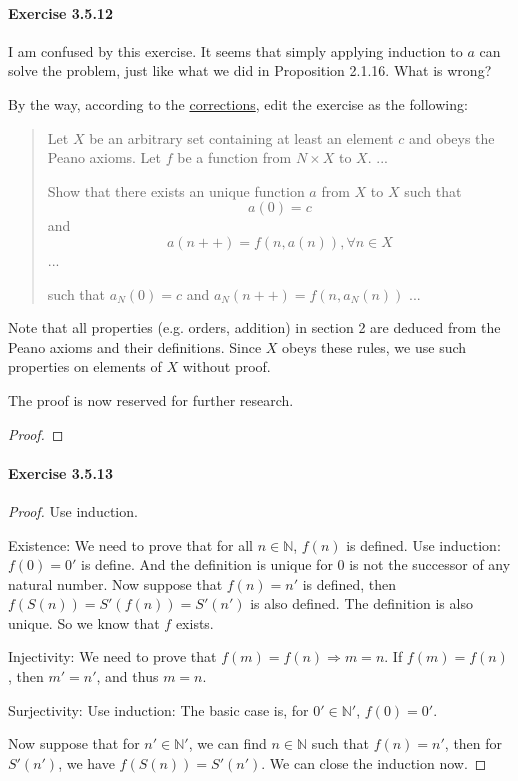 \paragraph{Exercise 3.5.12} \label{exercise3.5.12}
I am confused by this exercise. It seems that simply applying induction to $a$ can solve the 
problem, just like what we did in Proposition 2.1.16. What is wrong?

By the way, according to the \href{https://terrytao.wordpress.com/books/analysis-i/}{corrections}, 
edit the exercise as the following:
\begin{quotation}
Let $X$ be an arbitrary set containing at least an element $c$ and obeys the Peano axioms. Let $f$ be a 
function from $N \times X$ to $X$. ... 

Show that there exists an unique function $a$ from $X$ to $X$ such that 
\[
a(0) = c
\] 
and 
\[
a(n++) = f(n,a(n)), \forall n \in X
\]
...

such that $a_N(0) = c$ and $a_{N}(n++) = f(n,a_N(n))$ ... 
\end{quotation}

Note that all properties (e.g. orders, addition) in section 2 are deduced from the Peano axioms and their 
definitions. Since $X$ obeys these rules, we use such properties on elements of $X$ without proof.

The proof is now reserved for further research.
\begin{proof}
\end{proof}

\paragraph{Exercise 3.5.13} \label{exercise3.5.13}
\begin{proof}
Use induction.

Existence: We need to prove that for all $n \in \mathbb{N}$, $f(n)$ is defined. Use induction:
$f(0) = 0'$ is define. And the definition is unique for $0$ is not the successor of any natural number. 
Now suppose that $f(n) = n'$ is defined, then $f(S(n)) = S'(f(n)) = S'(n')$ is also defined. The 
definition is also unique. So we know that $f$ exists.

Injectivity: We need to prove that $f(m) = f(n) \Longrightarrow m = n$. If $f(m) = f(n)$, then $m' = n'$, 
and thus $m=n$. 

Surjectivity: Use induction: 
The basic case is, for $0' \in \mathbb{N}'$, $f(0) = 0'$. 

Now suppose that for $n' \in \mathbb{N}'$, we can find $n \in \mathbb{N}$ such that $f(n) = n'$, then 
for $S'(n')$, we have $f(S(n)) = S'(n')$. We can close the induction now.
\end{proof}